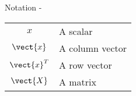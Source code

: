 
\begin{frame}[allowframebreaks,t]{Notation -}

\begin{tabular}{cl}

$x$             & A scalar            \\
$\vect{x}$      & A column vector     \\
$\vect{x}^T$    & A row vector        \\
$\vect{X}$      & A matrix            \\

\end{tabular}

\end{frame}
